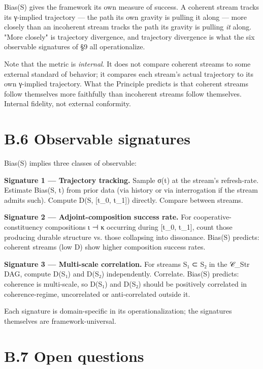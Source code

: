 \documentclass[11pt, openany]{book}
\newcommand{\sectionbreak}{\clearpage}
\begin{document}
Bias(S) gives the framework its own measure of success. A coherent stream tracks its γ-implied trajectory --- the path its own gravity is pulling it along --- more closely than an incoherent stream tracks the path its gravity is pulling \textit{it} along. "More closely" is trajectory divergence, and trajectory divergence is what the six observable signatures of §9 all operationalize.

Note that the metric is \textit{internal}. It does not compare coherent streams to some external standard of behavior; it compares each stream's actual trajectory to its own γ-implied trajectory. What the Principle predicts is that coherent streams follow themselves more faithfully than incoherent streams follow themselves. Internal fidelity, not external conformity.

\sectionbreak

\section{B.6 Observable signatures}

Bias(S) implies three classes of observable:

\textbf{Signature 1 --- Trajectory tracking.} Sample σ(t) at the stream's refresh-rate. Estimate Bias(S, t) from prior data (via history or via interrogation if the stream admits such). Compute D(S, [t\_\allowbreak{}0, t\_\allowbreak{}1]) directly. Compare between streams.

\textbf{Signature 2 --- Adjoint-composition success rate.} For cooperative-constituency compositions ι ⊣ κ occurring during [t\_\allowbreak{}0, t\_\allowbreak{}1], count those producing durable structure vs. those collapsing into dissonance. Bias(S) predicts: coherent streams (low D) show higher composition success rates.

\textbf{Signature 3 --- Multi-scale correlation.} For streams S₁ ⊂ S₂ in the 𝒞\_\allowbreak{}Str DAG, compute D(S₁) and D(S₂) independently. Correlate. Bias(S) predicts: coherence is multi-scale, so D(S₁) and D(S₂) should be positively correlated in coherence-regime, uncorrelated or anti-correlated outside it.

Each signature is domain-specific in its operationalization; the signatures themselves are framework-universal.

\sectionbreak

\section{B.7 Open questions}
\end{document}
